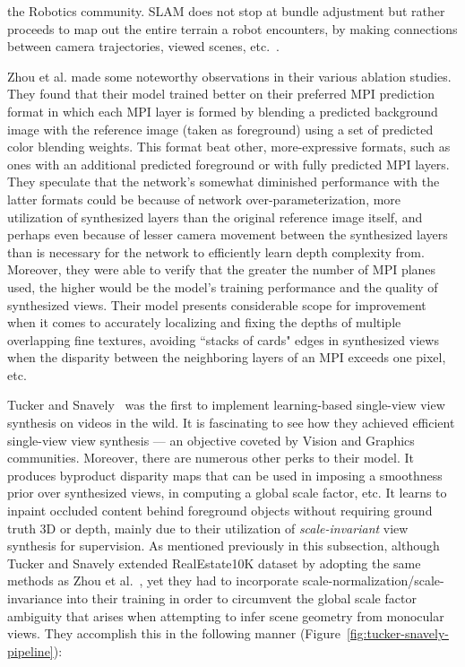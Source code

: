 the Robotics community. SLAM does not stop at bundle adjustment but rather proceeds to map out the entire terrain a robot encounters, by making connections between camera trajectories, viewed scenes, etc.~\cite{noauthor_what_nodate}. 

Zhou et al. made some noteworthy observations in their various ablation studies. They found that their model trained better on their preferred MPI prediction format in which each MPI layer is formed by blending a predicted background image with the reference image (taken as foreground) using a set of predicted color blending weights. This format beat other, more-expressive formats, such as ones with an additional predicted foreground or with fully predicted MPI layers. They speculate that the network's somewhat diminished performance with the latter formats could be because of network over-parameterization, more utilization of synthesized layers than the original reference image itself, and perhaps even because of lesser camera movement between the synthesized layers than is necessary for the network to efficiently learn depth complexity from. Moreover, they were able to verify that the greater the number of MPI planes used, the higher would be the model's training performance and the quality of synthesized views. Their model presents considerable scope for improvement when it comes to accurately localizing and fixing the depths of multiple overlapping fine textures, avoiding ``stacks of cards" edges in synthesized views when the disparity between the neighboring layers of an MPI exceeds one pixel, etc.

Tucker and Snavely~\cite{single_view_mpi} was the first to implement learning-based single-view view synthesis on videos in the wild. It is fascinating to see how they achieved efficient single-view view synthesis --- an objective coveted by Vision and Graphics communities. Moreover, there are numerous other perks to their model. It produces byproduct disparity maps that can be used in imposing a smoothness prior over synthesized views, in computing a global scale factor, etc. It learns to inpaint occluded content behind foreground objects without requiring ground truth 3D or depth, mainly due to their utilization of \textit{scale-invariant} view synthesis for supervision. As mentioned previously in this subsection, although Tucker and Snavely extended RealEstate10K dataset by adopting the same methods as Zhou et al.~\cite{zhou2018stereo}, yet they had to incorporate scale-normalization/scale-invariance into their training in order to circumvent the global scale factor ambiguity that arises when attempting to infer scene geometry from monocular views. They accomplish this in the following manner (Figure~\ref{fig:tucker-snavely-pipeline}):

